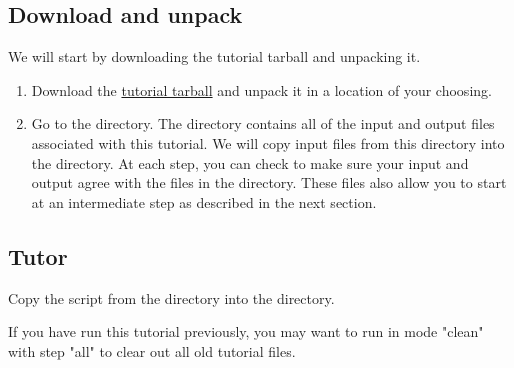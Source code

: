 \subsection{Download and unpack}

We will start by downloading the tutorial tarball and unpacking it.

\begin{enumerate}
\item Download the \href{http://www.geodynamics.org:8080/cig/Members/willic3/pylithusers/pylith0.8/pylith-0.8\_tutorials.tgz}{tutorial tarball}
  and unpack it in a location of your choosing.

  \begin{screen}
    \shellprompt{}
  \end{screen}
  
\item Go to the  directory.
  The  directory contains all of the input and
  output files associated with this tutorial. We will copy input files
  from this directory into the  directory. At each
  step, you can check to make sure your input and output agree with
  the files in the  directory. These files also
  allow you to start at an intermediate step as described in the next
  section.

  \begin{screen}
    \shellprompt{}
  \end{screen}

\end{enumerate}

\subsection{Tutor}

Copy the  script from the 
directory into the  directory. 

\begin{tip}
  If you have run this tutorial previously, you may want to run
   in mode "clean" with step "all" to clear out all
  old tutorial files.
\end{tip}

\begin{screen}
\shellprompt{}
\shellprompt{}
\shellprompt{}
\end{screen}

